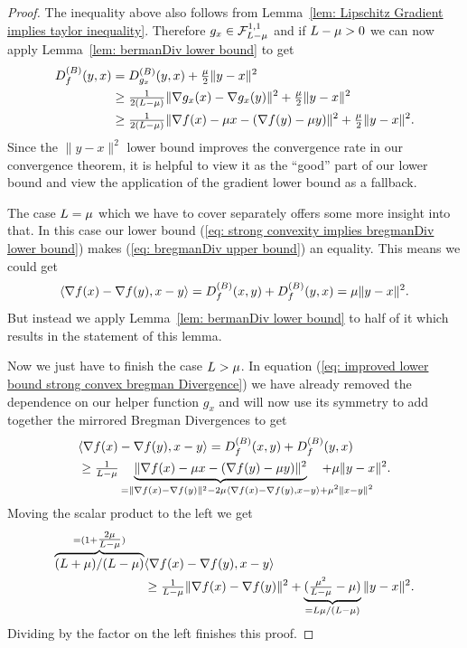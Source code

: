 \begin{proof}
	The inequality above also follows from Lemma~\ref{lem: Lipschitz Gradient
	implies taylor inequality}. Therefore
	\(g_x\in\mathcal{F}^{1,1}_{L-\mu}\) and if \(L -\mu>0\) we
	can now apply Lemma~\ref{lem: bermanDiv lower bound} to get
	\begin{align}
		D^{(B)}_{f}(y,x)
		&= D^{(B)}_{g_x}(y,x) + \tfrac{\mu}2 \|y-x\|^2
		\nonumber \\
		&\ge \tfrac{1}{2(L-\mu)} \|\nabla g_x(x) - \nabla g_x(y)\|^2
		+ \tfrac{\mu}2 \|y-x\|^2 
		\nonumber \\
		\label{eq: improved lower bound strong convex bregman Divergence}
		&\ge \tfrac{1}{2(L-\mu)}
		\|\nabla f(x) - \mu x - (\nabla f(y)-\mu y)\|^2
		+ \tfrac{\mu}2 \|y-x\|^2.
	\end{align}
	Since the \(\|y-x\|^2\) lower bound improves the convergence rate in
	our convergence theorem, it is helpful to view it as the ``good'' part of
	our lower bound and view the application of the gradient lower bound as
	a fallback.

	The case \(L=\mu\) which we have to cover separately offers some
	more insight into that. In this case our lower bound  (\ref{eq:
	strong convexity implies bregmanDiv lower bound}) makes (\ref{eq: bregmanDiv
	upper bound}) an equality. This means we could get
	\begin{align*}
		\langle \nabla f(x) - \nabla f(y), x-y\rangle
		= D^{(B)}_{f}(x,y) + D^{(B)}_{f}(y,x) = \mu \|y-x\|^2.
	\end{align*}
	But instead we apply Lemma~\ref{lem: bermanDiv lower bound} to half of it
	which results in the statement of this lemma.

	Now we just have to finish the case \(L>\mu\). In equation
	(\ref{eq: improved lower bound strong convex bregman Divergence}) we have
	already removed the dependence on our helper function \(g_x\) and will now
	use its symmetry to add together the mirrored Bregman Divergences to get
	\begin{align*}
		&\langle \nabla f(x) - \nabla f(y), x-y\rangle
		= \bregmanDiv{f}(x,y) + \bregmanDiv{f}(y,x) \\
		&\ge \tfrac{1}{\ubound-\lbound}
		\underbrace{\|\nabla f(x) - \lbound x - (\nabla f(y)-\lbound y)\|^2}_{
			=\|\nabla f(x) - \nabla f(y)\|^2
			- 2\lbound \langle \nabla f(x) - \nabla f(y), x-y\rangle
			\mathrlap{+ \lbound^2 \| x-y\|^2}
		}
		+ \lbound \|y-x\|^2.
	\end{align*}
	Moving the scalar product to the left we get
	\begin{align*}
		\overbrace{(L+\mu)/(L-\mu)}^{
			= (1+\tfrac{2\mu}{L-\mu})
		}
		&\langle \nabla f(x) - \nabla f(y), x-y\rangle \\
		&\ge \tfrac{1}{L-\mu}\|\nabla f(x) - \nabla f(y)\|^2
		+ \underbrace{(\tfrac{\mu^2}{L-\mu}-\mu)}_{
			=L\mu/(L-\mu)
		} \|y-x\|^2.
	\end{align*}
	Dividing by the factor on the left finishes this proof.
 \end{proof}

